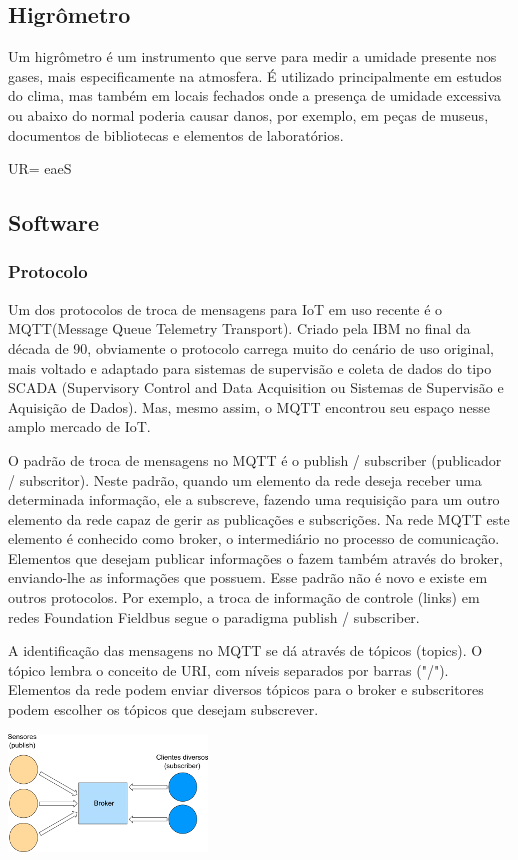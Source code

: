 \documentclass[twocolumn,11pt]{article}
\begin{document}
{\subsection{Higrômetro}
Um higrômetro é um instrumento que serve para medir a umidade presente nos gases, mais especificamente na atmosfera. É utilizado principalmente em estudos do clima, mas também em locais fechados onde a presença de umidade excessiva ou abaixo do normal poderia causar danos, por exemplo, em peças de museus, documentos de bibliotecas e elementos de laboratórios.\par
UR= eaeS 

\subsection{Software}
\subsubsection{Protocolo}
Um dos protocolos de troca de mensagens para IoT em uso recente é o MQTT(Message Queue Telemetry Transport). Criado pela IBM no final da década de 90, obviamente o protocolo carrega muito do cenário de uso original, mais voltado e adaptado para sistemas de supervisão e coleta de dados do tipo SCADA (Supervisory Control and Data Acquisition ou Sistemas de Supervisão e Aquisição de Dados). Mas, mesmo assim, o MQTT encontrou seu espaço nesse amplo mercado de IoT.\par
O padrão de troca de mensagens no MQTT é o publish / subscriber (publicador / subscritor). Neste padrão, quando um elemento da rede deseja receber uma determinada informação, ele a subscreve, fazendo uma requisição para um outro elemento da rede capaz de gerir as publicações e subscrições. Na rede MQTT este elemento é conhecido como broker, o intermediário no processo de comunicação. Elementos que desejam publicar informações o fazem também através do broker, enviando-lhe as informações que possuem. Esse padrão não é novo e existe em outros protocolos. Por exemplo, a troca de informação de controle (links) em redes Foundation Fieldbus segue o paradigma publish / subscriber.\par
A identificação das mensagens no MQTT se dá através de tópicos (topics). O tópico lembra o conceito de URI, com níveis separados por barras ("/"). Elementos da rede podem enviar diversos tópicos para o broker e subscritores podem escolher os tópicos que desejam subscrever.\par
\includegraphics{mqtt_small.png}
}
\end{document}
